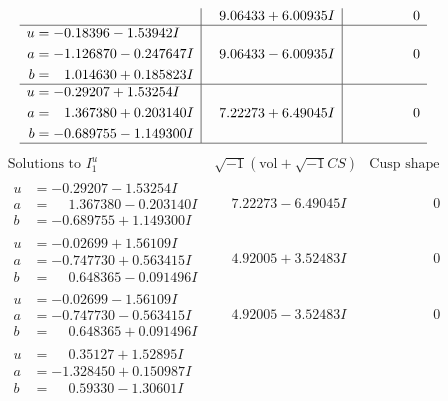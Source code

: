\documentclass[1p]{elsarticle_modified}
\theoremstyle{definition}
\newcommand{\I}{\sqrt{-1}}
\begin{document}
$$\begin{array}{c|c|c}
 & \phantom{-}9.06433 + 6.00935 I & \phantom{-0.000000 } 0 \\ \hline\begin{aligned}
u &= -0.18396 - 1.53942 I \\
a &= -1.126870 - 0.247647 I \\
b &= \phantom{-}1.014630 + 0.185823 I\end{aligned}
 & \phantom{-}9.06433 - 6.00935 I & \phantom{-0.000000 } 0 \\ \hline\begin{aligned}
u &= -0.29207 + 1.53254 I \\
a &= \phantom{-}1.367380 + 0.203140 I \\
b &= -0.689755 - 1.149300 I\end{aligned}
 & \phantom{-}7.22273 + 6.49045 I & \phantom{-0.000000 } 0\\
 \hline 
 \end{array}$$\newpage$$\begin{array}{c|c|c}  
\text{Solutions to }I^u_{1}& \I (\text{vol} + \sqrt{-1}CS) & \text{Cusp shape}\\
 \hline 
\begin{aligned}
u &= -0.29207 - 1.53254 I \\
a &= \phantom{-}1.367380 - 0.203140 I \\
b &= -0.689755 + 1.149300 I\end{aligned}
 & \phantom{-}7.22273 - 6.49045 I & \phantom{-0.000000 } 0 \\ \hline\begin{aligned}
u &= -0.02699 + 1.56109 I \\
a &= -0.747730 + 0.563415 I \\
b &= \phantom{-}0.648365 - 0.091496 I\end{aligned}
 & \phantom{-}4.92005 + 3.52483 I & \phantom{-0.000000 } 0 \\ \hline\begin{aligned}
u &= -0.02699 - 1.56109 I \\
a &= -0.747730 - 0.563415 I \\
b &= \phantom{-}0.648365 + 0.091496 I\end{aligned}
 & \phantom{-}4.92005 - 3.52483 I & \phantom{-0.000000 } 0 \\ \hline\begin{aligned}
u &= \phantom{-}0.35127 + 1.52895 I \\
a &= -1.328450 + 0.150987 I \\
b &= \phantom{-}0.59330 - 1.30601 I\end{aligned}

\end{array}$$
\end{document}
